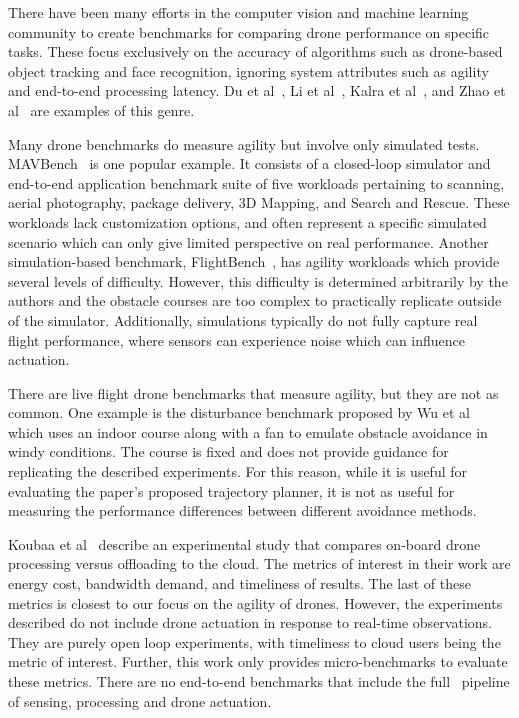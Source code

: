 There have been many efforts in the computer vision and machine
learning community to create benchmarks for comparing drone
performance on specific tasks. These focus exclusively on the accuracy
of algorithms such as drone-based object tracking and face
recognition, ignoring system attributes such as agility and end-to-end
processing latency. Du et al~\cite{Du2018}, Li et al~\cite{Li2017},
Kalra et al~\cite{Kalra2019}, and Zhao et al~\cite{Zhao2024} are
examples of this genre.

Many drone benchmarks do measure agility but involve only simulated
tests. MAVBench~\cite{Boroujerdian2018} is one popular example. It
consists of a closed-loop simulator and end-to-end application
benchmark suite of five workloads pertaining to scanning, aerial
photography, package delivery, 3D Mapping, and Search and Rescue.
These workloads lack customization options, and often represent a
specific simulated scenario which can only give limited perspective on
real performance. Another simulation-based benchmark,
FlightBench~\cite{Yu2024}, has agility workloads which provide several
levels of difficulty. However, this difficulty is determined
arbitrarily by the authors and the obstacle courses are too complex to
practically replicate outside of the simulator. Additionally,
simulations typically do not fully capture real flight performance,
where sensors can experience noise which can influence actuation.

There are live flight drone benchmarks that measure agility, but they
are not as common. One example is the disturbance benchmark proposed
by Wu et al~\cite{Wu2021} which uses an indoor course along with a fan
to emulate obstacle avoidance in windy conditions. The course is fixed
and does not provide guidance for replicating the described
experiments. For this reason, while it is useful for evaluating the
paper's proposed trajectory planner, it is not as useful for measuring
the performance differences between different avoidance methods.

Koubaa et al~\cite{Koubaa2020} describe an experimental study that
compares on-board drone processing versus offloading to the cloud. The
metrics of interest in their work are energy cost, bandwidth demand,
and timeliness of results.  The last of these metrics is closest to
our focus on the agility of drones.  However, the experiments
described do not include drone actuation in response to real-time
observations.  They are purely open loop experiments, with timeliness
to cloud users being the metric of interest.  Further, this work only
provides micro-benchmarks to evaluate these metrics.  There are no
end-to-end benchmarks that include the full \ooda~pipeline of
sensing, processing and drone actuation.

